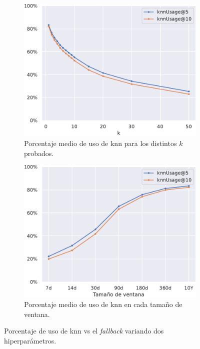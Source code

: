 \begin{figure}[t]
    \centering
    \begin{subfigure}{.48\textwidth}
        \centering
        \includegraphics[width=\linewidth]{figures/04_implementacion/11_knn_usage_k_W-THU_normalize=True.pdf}
        \caption{Porcentaje medio de uso de knn para los distintos $k$ probados.}
        \label{fig:knn_usage_k}
    \end{subfigure}\hfill\begin{subfigure}{.48\textwidth}
        \centering
        \includegraphics[width=\linewidth]{figures/04_implementacion/11_knn_usage_window_size_W-THU_normalize=True.pdf}
        \caption{Porcentaje medio de uso de knn en cada tamaño de ventana.}
        \label{fig:knn_usage_window_size}
    \end{subfigure}
    \caption[Porcentaje de uso de \acrshort{knn} vs el \textit{fallback} variando hiperparámetros.]{Porcentaje de uso de \gls{knn} vs el \textit{fallback} variando dos hiperparámetros.}
    \label{fig:knn_usage}
\end{figure}


